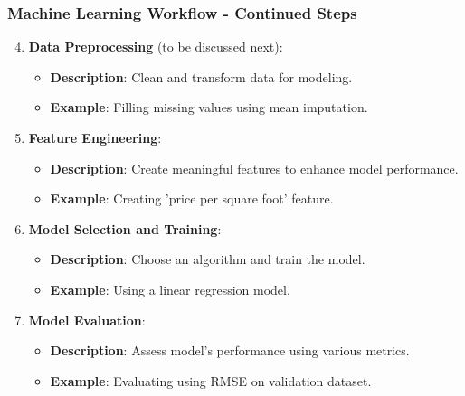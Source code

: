 \documentclass[aspectratio=169]{beamer}
\begin{document}
\begin{frame}[fragile]
    \frametitle{Machine Learning Workflow - Continued Steps}
    \begin{enumerate}
        \setcounter{enumi}{3}
        
        \item \textbf{Data Preprocessing} (to be discussed next):
        \begin{itemize}
            \item \textbf{Description}: Clean and transform data for modeling.
            \item \textbf{Example}: Filling missing values using mean imputation.
        \end{itemize}
        
        \item \textbf{Feature Engineering}:
        \begin{itemize}
            \item \textbf{Description}: Create meaningful features to enhance model performance.
            \item \textbf{Example}: Creating 'price per square foot' feature.
        \end{itemize}

        \item \textbf{Model Selection and Training}:
        \begin{itemize}
            \item \textbf{Description}: Choose an algorithm and train the model.
            \item \textbf{Example}: Using a linear regression model.
        \end{itemize}
        
        \item \textbf{Model Evaluation}:
        \begin{itemize}
            \item \textbf{Description}: Assess model's performance using various metrics.
            \item \textbf{Example}: Evaluating using RMSE on validation dataset.
        \end{itemize}
    \end{enumerate}
\end{frame}
\end{document}
